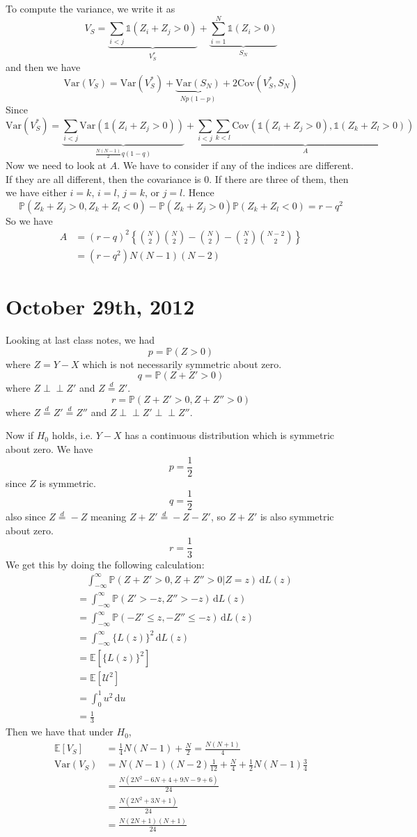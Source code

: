 \documentclass[a4paper,12pt]{amsart}
\newcommand{\Var}{\mbox{Var}}
\newcommand{\Cov}{\mbox{Cov}}
\newcommand{\E}[1]{\mathbb{E}\left[#1\right]}
\newcommand{\p}[1]{\mathbb{P}\left(#1\right)}
\newcommand{\indep}{\perp \!\!\! \perp}
\begin{document}
To compute the variance, we write it as
\[V_S = \underbrace{\sum_{i < j} \mathds{1}(Z_i + Z_j > 0)}_{V_S^*} + \underbrace{\sum_{i=1}^N \mathds{1}(Z_i > 0)}_{S_N}\]
and then we have
\[\Var(V_S) = \Var(V_S^*) + \underbrace{\Var(S_N)}_{Np(1-p)} + 2\Cov(V_S^*,S_N) \]
Since
\[
\Var(V_S^*) = \underbrace{\sum_{i < j} \Var(\mathds{1}(Z_i + Z_j > 0))}_{\frac{N(N-1)}{2}q(1-q)} + \underbrace{\sum_{i < j} \sum_{k < l} \Cov(\mathds{1}(Z_i + Z_j > 0 ),\mathds{1}(Z_k + Z_l > 0))}_{A}\]
Now we need to look at $A$. We have to consider if any of the indices are different. If they are all different, then the covariance is 0. If there are three of them, then we have either $i=k$, $i=l$, $j=k$, or $j=l$. Hence
\[\p{Z_k + Z_j > 0, Z_k + Z_l < 0 } - \p{Z_k + Z_j > 0}\p{ Z_k + Z_l < 0 }  = r-q^2\]
So we have
\begin{align*}
A &= (r-q)^2 \left\{{N \choose 2}{N \choose 2} - {N \choose 2} - {N \choose 2}{N-2 \choose 2}\right\}\\
&= (r-q^2)N(N-1)(N-2)
\end{align*}


\section{October 29th, 2012}
Looking at last class notes, we had
\[p = \p{Z>0}\]
where $Z = Y-X$ which is not necessarily symmetric about zero.
\[q = \p{Z + Z' > 0}\]
where $Z \indep Z'$ and $Z \overset{d}{=}Z'$.
\[r = \p{Z + Z' > 0, Z + Z''>0}\]
where $Z \overset{d}{=} Z' \overset{d}{=}Z''$ and $Z \indep Z' \indep Z''$.

Now if $H_0$ holds, i.e. $Y-X$ has a continuous distribution which is symmetric about zero. We have
\[p = \frac{1}{2}\]
since $Z$ is symmetric. 
\[q = \frac{1}{2}\]
also since $Z \overset{d}{=} -Z$ meaning $Z + Z' \overset{d}{=} -Z - Z'$, so $Z + Z'$ is also symmetric about zero.
\[r = \frac{1}{3}\]
We get this by doing the following calculation:
\begin{align*}
&\quad\int_{-\infty}^\infty \! \p{Z + Z' >0, Z+ Z''>0|Z=z} \,\mathrm{d}L(z)\\
&=\int_{-\infty}^\infty \! \p{Z' >-z, Z''>-z} \,\mathrm{d}L(z)\\
&=\int_{-\infty}^\infty \! \p{-Z'\leq z, -Z''\leq -z} \,\mathrm{d}L(z)\\
&= \int_{-\infty}^\infty \! \{L(z)\}^2 \, \mathrm{d}L(z)\\
&= \E{\{L(z)\}^2}\\
&= \E{\mathcal{U}^2}\\
&= \int_0^1 \! u^2 \,\mathrm{d}u\\
&= \frac{1}{3}
\end{align*}
Then we have that under $H_0$, 
\begin{align*}
\E{V_S} &= \frac{1}{4}N(N-1) + \frac{N}{2} = \frac{N(N+1)}{4}\\
\Var(V_S) &= N(N-1)(N-2)\frac{1}{12} + \frac{N}{4} + \frac{1}{2}N(N-1)\frac{3}{4}\\
&= \frac{N(2N^2 - 6N + 4 + 9N - 9 + 6)}{24}\\
&= \frac{N(2N^2 + 3N + 1)}{24}\\
&= \frac{N(2N+1)(N+1)}{24}
\end{align*}
\end{document}
